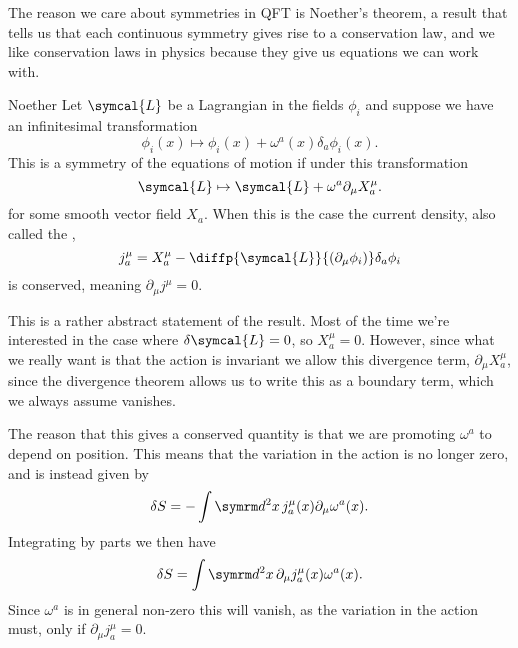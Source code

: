 \documentclass[fleqn]{NotesClass}
\renewcommand{\dl}[1]{\symrm{d}#1}
\newcommand{\lagrangian}{\symcal{L}}
\begin{document}
    The reason we care about symmetries in QFT is Noether's theorem, a result that tells us that each continuous symmetry gives rise to a conservation law, and we like conservation laws in physics because they give us equations we can work with.
    
    \begin{thm}{Noether}{}
        Let \(\lagrangian\) be a Lagrangian in the fields \(\phi_i\) and suppose we have an infinitesimal transformation
        \begin{equation}
            \phi_i(x) \mapsto \phi_i(x) + \omega^a(x) \delta_a \phi_i(x).
        \end{equation}
        This is a symmetry of the equations of motion if under this transformation
        \begin{equation}
            \lagrangian \mapsto \lagrangian + \omega^a \partial_\mu X^\mu_a.
        \end{equation}
        for some smooth vector field \(X_a\).
        When this is the case the current density, also called the ,
        \begin{equation}
            j^\mu_a = X^\mu_a - \diffp{\lagrangian}{(\partial_\mu \phi_i)} \delta_a\phi_i
        \end{equation}
        is conserved, meaning \(\partial_\mu j^\mu = 0\).
    \end{thm}
    
    This is a rather abstract statement of the result.
    Most of the time we're interested in the case where \(\delta \lagrangian = 0\), so \(X^\mu_a = 0\).
    However, since what we really want is that the action is invariant we allow this divergence term, \(\partial_\mu X^\mu_a\), since the divergence theorem allows us to write this as a boundary term, which we always assume vanishes.
    
    The reason that this gives a conserved quantity is that we are promoting \(\omega^a\) to depend on position.
    This means that the variation in the action is no longer zero, and is instead given by
    \begin{equation}
        \delta S = -\int \dl^2x \, j^\mu_a(x) \partial_\mu \omega^a(x).
    \end{equation}
    Integrating by parts we then have
    \begin{equation}
        \delta S = \int \dl^2x \, \partial_\mu j^\mu_a(x) \omega^a(x).
    \end{equation}
    Since \(\omega^a\) is in general non-zero this will vanish, as the variation in the action must, only if \(\partial_\mu j^\mu_a = 0\).
    
\end{document}
